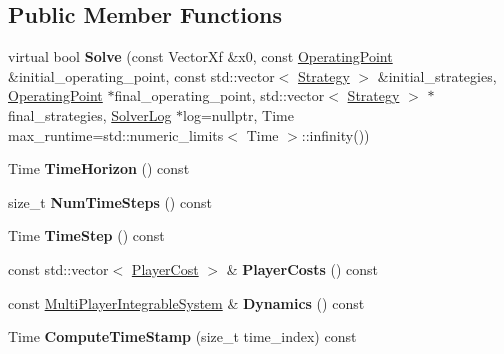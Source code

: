 \subsection*{Public Member Functions}
\begin{DoxyCompactItemize}
\item 
virtual bool {\bfseries Solve} (const Vector\+Xf \&x0, const \hyperlink{structilqgames_1_1_operating_point}{Operating\+Point} \&initial\+\_\+operating\+\_\+point, const std\+::vector$<$ \hyperlink{structilqgames_1_1_strategy}{Strategy} $>$ \&initial\+\_\+strategies, \hyperlink{structilqgames_1_1_operating_point}{Operating\+Point} $\ast$final\+\_\+operating\+\_\+point, std\+::vector$<$ \hyperlink{structilqgames_1_1_strategy}{Strategy} $>$ $\ast$final\+\_\+strategies, \hyperlink{classilqgames_1_1_solver_log}{Solver\+Log} $\ast$log=nullptr, Time max\+\_\+runtime=std\+::numeric\+\_\+limits$<$ Time $>$\+::infinity())\hypertarget{classilqgames_1_1_game_solver_a24ed8caa4c9217122f7ce86f16d1bd34}{}\label{classilqgames_1_1_game_solver_a24ed8caa4c9217122f7ce86f16d1bd34}

\item 
Time {\bfseries Time\+Horizon} () const \hypertarget{classilqgames_1_1_game_solver_a9fa5328990bd8139c556c09453020e33}{}\label{classilqgames_1_1_game_solver_a9fa5328990bd8139c556c09453020e33}

\item 
size\+\_\+t {\bfseries Num\+Time\+Steps} () const \hypertarget{classilqgames_1_1_game_solver_a8234f72d8ee55b7afe4d3557e2c9e117}{}\label{classilqgames_1_1_game_solver_a8234f72d8ee55b7afe4d3557e2c9e117}

\item 
Time {\bfseries Time\+Step} () const \hypertarget{classilqgames_1_1_game_solver_a113252da6aa43d0beb9966277653af04}{}\label{classilqgames_1_1_game_solver_a113252da6aa43d0beb9966277653af04}

\item 
const std\+::vector$<$ \hyperlink{classilqgames_1_1_player_cost}{Player\+Cost} $>$ \& {\bfseries Player\+Costs} () const \hypertarget{classilqgames_1_1_game_solver_afe05eb1238b481b82747f9edf005c301}{}\label{classilqgames_1_1_game_solver_afe05eb1238b481b82747f9edf005c301}

\item 
const \hyperlink{classilqgames_1_1_multi_player_integrable_system}{Multi\+Player\+Integrable\+System} \& {\bfseries Dynamics} () const \hypertarget{classilqgames_1_1_game_solver_aa0917153345988be1661fca76a6f8500}{}\label{classilqgames_1_1_game_solver_aa0917153345988be1661fca76a6f8500}

\item 
Time {\bfseries Compute\+Time\+Stamp} (size\+\_\+t time\+\_\+index) const \hypertarget{classilqgames_1_1_game_solver_a490b20711d5d698171620f5bce607027}{}\label{classilqgames_1_1_game_solver_a490b20711d5d698171620f5bce607027}

\end{DoxyCompactItemize}
